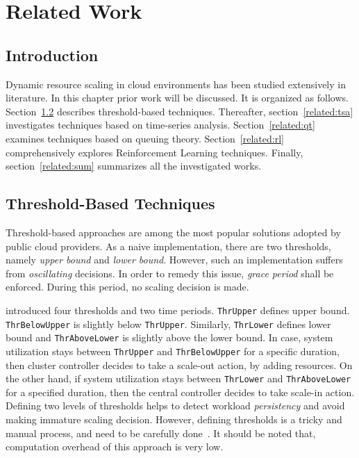 \chapter{Related Work}
\label{related}

\section{Introduction}
Dynamic resource scaling in cloud environments has been studied extensively in literature. In this chapter prior work will be discussed. It is organized as follows. Section~\ref{related:thb} describes threshold-based techniques. Thereafter, section~\ref{related:tsa} investigates techniques based on time-series analysis. Section~\ref{related:qt} examines techniques based on queuing theory. Section~\ref{related:rl} comprehensively explores Reinforcement Learning techniques. Finally, section~\ref{related:sum} summarizes all the investigated works.
\section{Threshold-Based Techniques}
\label{related:thb}
Threshold-based approaches are among the most popular solutions adopted by public cloud providers. As a naive implementation, there are two thresholds, namely \emph{upper bound} and \emph{lower bound}. However, such an implementation suffers from \emph{oscillating} decisions. In order to remedy this issue, \emph{grace period} shall be enforced. During this period, no scaling decision is made.

\textcite{Hasan2012IntegratedAA} introduced four thresholds and two time periods. \lstinline$ThrUpper$ defines upper bound. \lstinline$ThrBelowUpper$ is slightly below \lstinline$ThrUpper$. Similarly, \lstinline$ThrLower$ defines lower bound and \lstinline$ThrAboveLower$ is slightly above the lower bound. In case, system utilization stays between \lstinline$ThrUpper$ and \lstinline$ThrBelowUpper$ for a specific duration, then cluster controller decides to take a scale-out action, by adding resources. On the other hand, if system utilization stays between \lstinline$ThrLower$ and \lstinline$ThrAboveLower$ for a specified duration, then the central controller decides to take scale-in action. Defining two levels of thresholds helps to detect workload \emph{persistency} and avoid making immature scaling decision. However, defining thresholds is a tricky and manual process, and need to be carefully done~\cite{Dutreilh2010}. It should be noted that, computation overhead of this approach is very low.

